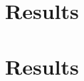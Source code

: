 \documentclass[twoside, 11pt]{article}
\begin{document}
		

\section{Results}





\section{Results}


%
%


\end{document}
